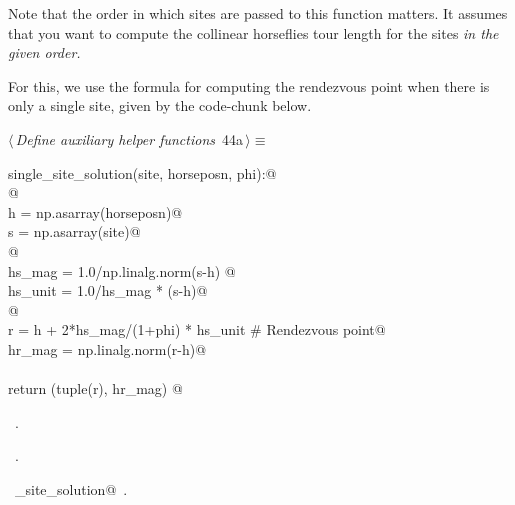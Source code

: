\documentclass[11.5pt]{report}
\begin{document}
Note that the order in which sites are passed to this function matters. It 
assumes that you want to compute the collinear horseflies tour length for the 
sites \textit{in the given order.} 

For this, we use the formula for computing the rendezvous point when there is 
only a single site, given by the code-chunk below. 


\begin{flushleft} \small\label{scrap65}\raggedright\small
{} $\langle\,${\itshape Define auxiliary helper functions}\nobreak\ {\footnotesize {44a}}$\,\rangle\equiv$
\vspace{-1ex}
\begin{list}{}{} \item
\mbox{}\verb@def single_site_solution(site, horseposn, phi):@\\
\mbox{}\verb@     @\\
\mbox{}\verb@     h = np.asarray(horseposn)@\\
\mbox{}\verb@     s = np.asarray(site)@\\
\mbox{}\verb@     @\\
\mbox{}\verb@     hs_mag  = 1.0/np.linalg.norm(s-h) @\\
\mbox{}\verb@     hs_unit = 1.0/hs_mag * (s-h)@\\
\mbox{}\verb@     @\\
\mbox{}\verb@     r      = h +  2*hs_mag/(1+phi) * hs_unit # Rendezvous point@\\
\mbox{}\verb@     hr_mag = np.linalg.norm(r-h)@\\
\mbox{}\verb@@\\
\mbox{}\verb@     return (tuple(r), hr_mag) @\\
\mbox{}\verb@@{\NWsep}
\end{list}
\vspace{-1.5ex}
\footnotesize
\begin{list}{}{\setlength{\itemsep}{-\parsep}\setlength{\itemindent}{-\leftmargin}}
\item \NWtxtMacroDefBy\ .
\item \NWtxtMacroRefIn\ .
\item \NWtxtIdentsDefed\nobreak\  \verb@single_site_solution@\nobreak\ .
\item{}
\end{list}
\vspace{4ex}
\end{flushleft}
\end{document}
